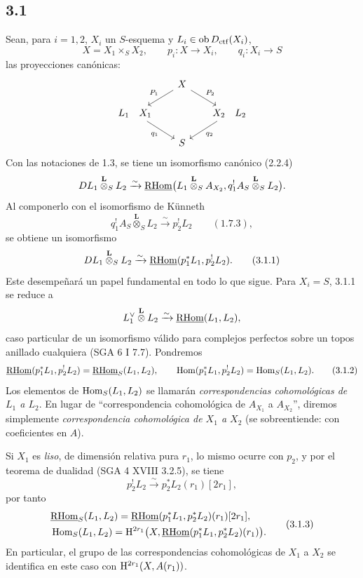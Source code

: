 \subsection*{3.1}
Sean, para $i=1,2$, $X_i$ un $S$-esquema y $L_i\in\operatorname{ob}D_{\mathrm{ctf}}(X_i)$,
\[
X=X_1\times_S X_2,
\qquad
p_i:X\longrightarrow X_i,
\qquad
q_i:X_i\longrightarrow S
\]
las proyecciones canónicas:
\[
\begin{tikzcd}[column sep=1.8em,row sep=1.5em]
& X \arrow[dl,"P_1"'] \arrow[dr,"P_2"] & \\
L_1\quad X_1 \arrow[dr,"q_1"'] & & X_2\quad L_2 \arrow[dl,"q_2"] \\
& S &
\end{tikzcd}
\]
Con las notaciones de 1.3, se tiene un isomorfismo canónico (2.2.4)
\[
DL_1\overset{\mathbf L}{\otimes}_S L_2
\xrightarrow{\sim}
\underline{\mathrm{RHom}}\bigl(L_1\overset{\mathbf L}{\otimes}_S A_{X_2},
q_1^!A_S\overset{\mathbf L}{\otimes}_S L_2\bigr).
\]
Al componerlo con el isomorfismo de Künneth
\[
q_1^!A_S\overset{\mathbf L}{\otimes}_S L_2
\xrightarrow{\sim}p_2^!L_2 \qquad (1.7.3),
\]
se obtiene un isomorfismo
\begin{equation}
DL_1\overset{\mathbf L}{\otimes}_S L_2
\xrightarrow{\sim}
\underline{\mathrm{RHom}}(p_1^*L_1,p_2^!L_2).
\tag{3.1.1}
\end{equation}
Este desempeñará un papel fundamental en todo lo que sigue. Para $X_i=S$, 3.1.1 se reduce a
\[
L_1^\vee\overset{\mathbf L}{\otimes}L_2\xrightarrow{\sim}\underline{\mathrm{RHom}}(L_1,L_2),
\]
caso particular de un isomorfismo válido para complejos perfectos sobre un topos anillado cualquiera (SGA 6 I 7.7). Pondremos
\begin{equation}
\underline{\mathrm{RHom}}(p_1^*L_1,p_2^!L_2)=\underline{\mathrm{RHom}}_S(L_1,L_2),
\qquad
\operatorname{Hom}(p_1^*L_1,p_2^!L_2)=\operatorname{Hom}_S(L_1,L_2).
\tag{3.1.2}
\end{equation}
Los elementos de $\operatorname{Hom}_S(L_1,L_2)$ se llamarán \emph{correspondencias cohomológicas de $L_1$ a $L_2$}. En lugar de ``correspondencia cohomológica de $A_{X_1}$ a $A_{X_2}$'', diremos simplemente \emph{correspondencia cohomológica de $X_1$ a $X_2$} (se sobreentiende: con coeficientes en $A$).

Si $X_1$ es \emph{liso}, de dimensión relativa pura $r_1$, lo mismo ocurre con $p_2$, y por el teorema de dualidad (SGA 4 XVIII 3.2.5), se tiene
\[
p_2^!L_2\xrightarrow{\sim}p_2^*L_2(r_1)[2r_1],
\]
por tanto
\begin{equation}
\begin{aligned}
&\underline{\mathrm{RHom}}_S(L_1,L_2)=\underline{\mathrm{RHom}}(p_1^*L_1,p_2^*L_2)(r_1)[2r_1],\\
&\operatorname{Hom}_S(L_1,L_2)=\mathrm{H}^{2r_1}\bigl(X,\underline{\mathrm{RHom}}(p_1^*L_1,p_2^*L_2)(r_1)\bigr).
\end{aligned}
\tag{3.1.3}
\end{equation}
En particular, el grupo de las correspondencias cohomológicas de $X_1$ a $X_2$ se identifica en este caso con $\mathrm{H}^{2r_1}(X,A(r_1))$.

